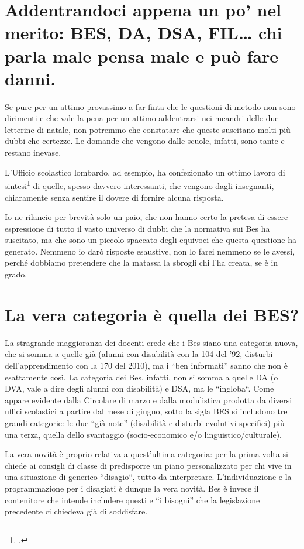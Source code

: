 \section*{Addentrandoci appena un po' nel merito: BES, DA, DSA, FIL… chi parla male pensa male e può fare danni.}
Se pure per un attimo provassimo a far finta che le questioni di metodo non sono dirimenti e che vale la pena per un attimo addentrarsi nei meandri delle due letterine di natale, non potremmo che constatare che queste suscitano molti più dubbi che certezze. Le domande che vengono dalle scuole, infatti, sono tante e restano inevase.

L'Ufficio scolastico lombardo, ad esempio, ha confezionato un ottimo lavoro di sintesi\footcite{USRperlaLombardia2103} di quelle, spesso davvero interessanti, che vengono dagli insegnanti, chiaramente senza sentire il dovere di fornire alcuna risposta.

Io ne rilancio per brevità solo un paio, che non hanno certo la pretesa di essere espressione di tutto il vasto universo di dubbi che la normativa sui Bes ha suscitato, ma che sono un piccolo spaccato degli equivoci che questa questione ha generato. Nemmeno io darò risposte esaustive, non lo farei nemmeno se le avessi, perché dobbiamo pretendere che la matassa la sbrogli chi l'ha creata, se è in grado.

\section*{La vera categoria  è quella dei BES?}
La stragrande maggioranza dei docenti crede che i Bes siano una categoria nuova, che si somma a quelle già  (alunni con disabilità con la 104 del '92, disturbi dell'apprendimento con la 170 del 2010), ma i “ben informati” sanno che non è esattamente così. La categoria dei Bes, infatti, non si somma a quelle DA (o DVA, vale a dire degli alunni con disabilità) e DSA, ma le “ingloba“. Come appare evidente dalla Circolare di marzo e dalla modulistica prodotta da diversi uffici scolastici a partire dal mese di giugno, sotto la sigla BES si includono tre grandi categorie: le due “già note” (disabilità e disturbi evolutivi specifici) più una terza, quella dello svantaggio (socio-economico e/o linguistico/culturale).

La vera novità è proprio relativa a quest'ultima categoria: per la prima volta si chiede ai consigli di classe di predisporre un piano personalizzato per chi vive in una situazione di generico “disagio“, tutto da interpretare. L'individuazione e la programmazione per i disagiati è dunque la vera novità. Bes è invece il contenitore che intende includere questi e “i bisogni” che la legislazione precedente ci chiedeva già di soddisfare.

